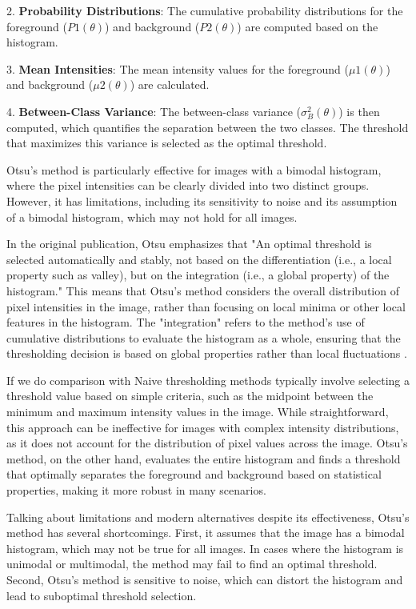 \documentclass[%
	a4paper, %
	12pt, %
	english, %
	bibtotoc %
]{scrartcl}
\begin{document}
2. \textbf{Probability Distributions}: The cumulative probability distributions for the foreground (\(P1(\theta)\)) and background (\(P2(\theta)\)) are computed based on the histogram.

3. \textbf{Mean Intensities}: The mean intensity values for the foreground (\(\mu1(\theta)\)) and background (\(\mu2(\theta)\)) are calculated.

4. \textbf{Between-Class Variance}: The between-class variance (\(\sigma_B^2(\theta)\)) is then computed, which quantifies the separation between the two classes. The threshold that maximizes this variance is selected as the optimal threshold.

Otsu's method is particularly effective for images with a bimodal histogram, where the pixel intensities can be clearly divided into two distinct groups. However, it has limitations, including its sensitivity to noise and its assumption of a bimodal histogram, which may not hold for all images.

In the original publication, Otsu emphasizes that "An optimal threshold is selected automatically and stably, not based on the differentiation (i.e., a local property such as valley), but on the integration (i.e., a global property) of the histogram." This means that Otsu's method considers the overall distribution of pixel intensities in the image, rather than focusing on local minima or other local features in the histogram. The "integration" refers to the method's use of cumulative distributions to evaluate the histogram as a whole, ensuring that the thresholding decision is based on global properties rather than local fluctuations \cite{Otsu1979}.

If we do comparison with Naive thresholding methods typically involve selecting a threshold value based on simple criteria, such as the midpoint between the minimum and maximum intensity values in the image. While straightforward, this approach can be ineffective for images with complex intensity distributions, as it does not account for the distribution of pixel values across the image. Otsu's method, on the other hand, evaluates the entire histogram and finds a threshold that optimally separates the foreground and background based on statistical properties, making it more robust in many scenarios.

Talking about limitations and modern alternatives despite its effectiveness, Otsu's method has several shortcomings. First, it assumes that the image has a bimodal histogram, which may not be true for all images. In cases where the histogram is unimodal or multimodal, the method may fail to find an optimal threshold. Second, Otsu's method is sensitive to noise, which can distort the histogram and lead to suboptimal threshold selection.
\end{document}
